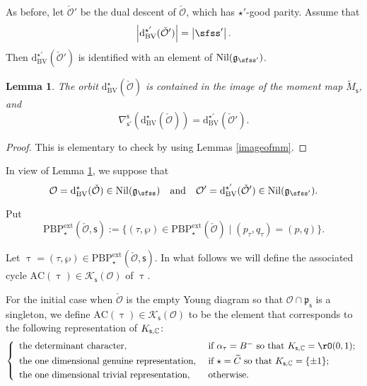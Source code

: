 \documentclass[12pt,a4paper]{amsart}
\def\abs#1{\left|{#1}\right|}
\newcommand{\CK}{{\mathcal {K}}}
\newcommand{\CO}{{\mathcal {O}}}
\newcommand{\g}{\mathfrak g}
\newcommand{\p}{\mathfrak p}
\numberwithin{equation}{section}
\newtheorem{lem}[thm]{Lemma}
\theoremstyle{remark}
\def\PBPe{\mathrm{PBP}^{\mathrm{ext}}}
\begin{document}

As before, let $\check \CO'$ be the dual descent of $\check \CO$, which has $\star'$-good parity. Assume that
\[
  \abs{\mathrm d_{\mathrm{BV}}^{\star'}(\check \CO')}=\abs{\sfss'}.
\]
Then  $\mathrm d_{\mathrm{BV}}^{\star'}(\check \CO')$ is identified with an element of $\mathrm{Nil}(\g_{\sfss'})$.

\begin{lem}\label{dualdesc}
The orbit $\mathrm d_{\mathrm{BV}}^{\star}(\check \CO)$ is contained in the image of the moment map $\tilde M_{\mathsf s}$, and
\[
  \nabla_{\mathsf s'}^{\mathsf s}(\mathrm d_{\mathrm{BV}}^{\star}(\check \CO))=\mathrm d_{\mathrm{BV}}^{\star'}(\check \CO').
\]
\end{lem}
\begin{proof}
This is elementary to check by using Lemmas \ref{imageofmm}.
\end{proof}

In view of Lemma \ref{dualdesc}, we suppose that
\[
\CO=\mathrm d_{\mathrm{BV}}^\star(\check \CO)\in \mathrm{Nil}(\g_\sfss)\quad \textrm{and}\quad \CO'=\mathrm d_{\mathrm{BV}}^{\star'}(\check \CO')\in \mathrm{Nil}(\g_{\sfss'}).
\]

Put
\begin{equation}\label{def:PBPs}
  \PBPe_\star(\check \CO,\mathsf s):=\{(\tau, \wp)\in  \PBPe_\star(\check \CO)\mid (p_\tau,q_\tau)=(p,q)\}.
\end{equation}

Let $\uptau=(\tau, \wp)\in \PBPe_\star(\check \CO,\mathsf s)$.
In what follows we will define the associated cycle $\mathrm{AC}(\uptau)\in\CK_{\mathsf s}(\CO)$ of $\uptau$.

For the initial case when $\check \CO$ is the empty Young diagram so that $\CO\cap \p_{\mathsf s}$ is a singleton, we define  $\mathrm{AC}(\uptau)\in\CK_{\mathsf s}(\CO)$ to be the element that corresponds to the following  representation of $K_{\mathsf s,\mathbb{C}}$:
 \[
\left\{
     \begin{array}{ll}
                    \textrm{the determinant character} , &\hbox{ if $\alpha_\tau=B^-$ so that $K_{\mathsf s,\C}=\rO(0,1)$;} \smallskip\\
                    \textrm{the one dimensional genuine representation} , &\hbox{ if $\star=\widetilde C$ so that $K_{\mathsf s,\C}=\{\pm 1\}$;} \smallskip\\
 \textrm{the one dimensional trivial representation} , &\hbox{ otherwise.}            \end{array}
   \right.
\]
\end{document}
